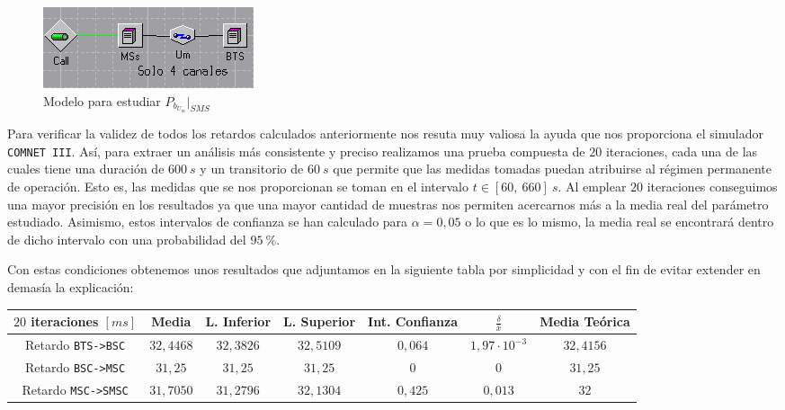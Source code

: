 \documentclass[10pt]{article}
\begin{document}
			\begin{figure}
					\centering
					\includegraphics[width=0.3\linewidth]{sms_pb.png}
					\caption{Modelo para estudiar $P_{b_{U_m}}\bigr\rvert_{SMS}$}
					\label{f:sms_pb}
			\end{figure}

			Para verificar la validez de todos los retardos calculados anteriormente nos resuta muy valiosa la ayuda que nos proporciona el simulador \texttt{COMNET III}. Así, para extraer un análisis más consistente y preciso realizamos una prueba compuesta de $20$ iteraciones, cada una de las cuales tiene una duración de $600\ s$ y un transitorio de $60\ s$ que permite que las medidas tomadas puedan atribuirse al régimen permanente de operación. Esto es, las medidas que se nos proporcionan se toman en el intervalo $t \in [60,\ 660]\ s$. Al emplear $20$ iteraciones conseguimos una mayor precisión en los resultados ya que una mayor cantidad de muestras nos permiten acercarnos más a la media real del parámetro estudiado. Asimismo, estos intervalos de confianza se han calculado para $\alpha = 0,05$ o lo que es lo mismo, la media real se encontrará dentro de dicho intervalo con una probabilidad del $95\ \%$.

			Con estas condiciones obtenemos unos resultados que adjuntamos en la siguiente tabla por simplicidad y con el fin de evitar extender en demasía la explicación:

			\begin{center}
				\begin{tabular}{|c|c|c|c|c|c|c|}
					\hline
					$20$ iteraciones $[ms]$ & Media & L. Inferior & L. Superior & Int. Confianza & $\frac{\delta}{\bar{x}}$ & Media Teórica\\
					\hline
					Retardo \texttt{BTS->BSC} & $32,4468$ & $32,3826$ & $32,5109$ & $0,064$ & $1,97 \cdot 10^{-3}$ & $32,4156$\\
					\hline
					Retardo \texttt{BSC->MSC} & $31,25$ & $31,25$ & $31,25$ & $0$ & $0$ & $31,25$\\
					\hline
					Retardo \texttt{MSC->SMSC} & $31,7050$ & $31,2796$ & $32,1304$ & $0,425$ & $0,013$ & $32$\\
					\hline
				\end{tabular}
			\end{center}
\end{document}
